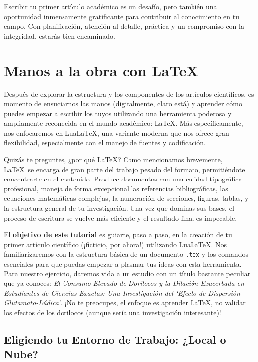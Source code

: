 Escribir tu primer artículo académico es un desafío, pero también una oportunidad
inmensamente gratificante para contribuir al conocimiento en tu campo.
Con planificación, atención al detalle, práctica y un compromiso con la
integridad, estarás bien encaminado.

\section{Manos a la obra con \LaTeX}
\label{sec:manos_a_la_obra_latex}

Después de explorar la estructura y los componentes de los artículos científicos, es momento de ensuciarnos las manos (digitalmente, claro está) y aprender cómo puedes empezar a escribir los tuyos utilizando una herramienta poderosa y ampliamente reconocida en el mundo académico: \LaTeX.
Más específicamente, nos enfocaremos en Lua\LaTeX, una variante moderna que nos ofrece gran flexibilidad, especialmente con el manejo de fuentes y codificación.

Quizás te preguntes, ¿por qué \LaTeX?
Como mencionamos brevemente, \LaTeX\ se encarga de gran parte del trabajo pesado del formato, permitiéndote concentrarte en el contenido.
Produce documentos con una calidad tipográfica profesional, maneja de forma excepcional las referencias bibliográficas, las ecuaciones matemáticas complejas, la numeración de secciones, figuras, tablas, y la estructura general de tu investigación.
Una vez que dominas sus bases, el proceso de escritura se vuelve más eficiente y el resultado final es impecable.

El \textbf{objetivo de este tutorial} es guiarte, paso a paso, en la creación de tu primer artículo científico (¡ficticio, por ahora!) utilizando Lua\LaTeX.
Nos familiarizaremos con la estructura básica de un documento \texttt{.tex} y los comandos esenciales para que puedas empezar a plasmar tus ideas con esta herramienta.
Para nuestro ejercicio, daremos vida a un estudio con un título bastante peculiar que ya conoces: \emph{El Consumo Elevado de Dorilocos y la Dilación Exacerbada en Estudiantes de Ciencias Exactas: Una Investigación del `Efecto de Dispersión Glutamato-Lúdica'}.
¡No te preocupes, el enfoque es aprender \LaTeX, no validar los efectos de los dorilocos (aunque sería una investigación interesante)!

\subsection{Eligiendo tu Entorno de Trabajo: ¿Local o Nube?}
\label{sub:eligiendo_entorno}

